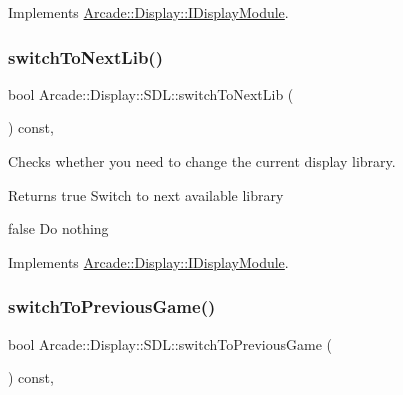 Implements \mbox{\hyperlink{classArcade_1_1Display_1_1IDisplayModule_a9584cb0ca3b157c9a4ec94509e4f8e32}{Arcade\+::\+Display\+::\+I\+Display\+Module}}.

\mbox{\label{classArcade_1_1Display_1_1SDL_a91bee5a87dfcacb4da9d6d148dc52a2b}} 
\subsubsection{\texorpdfstring{switchToNextLib()}{switchToNextLib()}}
{\footnotesize\ttfamily bool Arcade\+::\+Display\+::\+S\+D\+L\+::switch\+To\+Next\+Lib (\begin{DoxyParamCaption}{ }\end{DoxyParamCaption}) const\hspace{0.3cm}{\ttfamily [final]}, {\ttfamily [virtual]}}



Checks whether you need to change the current display library. 

\begin{DoxyReturn}{Returns}
true Switch to next available library 

false Do nothing 
\end{DoxyReturn}


Implements \mbox{\hyperlink{classArcade_1_1Display_1_1IDisplayModule_a0de47361c9d47bf8fc52070b945f23b7}{Arcade\+::\+Display\+::\+I\+Display\+Module}}.

\mbox{\label{classArcade_1_1Display_1_1SDL_ad9bf495fb4e7499c81b2d65a0602e7f1}} 
\subsubsection{\texorpdfstring{switchToPreviousGame()}{switchToPreviousGame()}}
{\footnotesize\ttfamily bool Arcade\+::\+Display\+::\+S\+D\+L\+::switch\+To\+Previous\+Game (\begin{DoxyParamCaption}{ }\end{DoxyParamCaption}) const\hspace{0.3cm}{\ttfamily [final]}, {\ttfamily [virtual]}}



